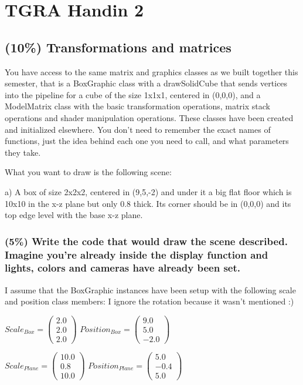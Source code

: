 \section{TGRA Handin 2}

\subsection{(10\%) Transformations and matrices}
You have access to  the same matrix and graphics classes as we built together this semester, that is a BoxGraphic class with a drawSolidCube that sends vertices into the pipeline for a cube of the size 1x1x1, centered in (0,0,0), and a ModelMatrix class with the basic transformation operations, matrix stack operations and shader manipulation operations. These classes have been created and initialized elsewhere.  You don’t need to remember the exact names of functions, just the idea behind each one you need to call, and what parameters they take. 

What you want to draw is the following scene: 

a) A box of size 2x2x2, centered in (9,5,-2) and under it a big flat floor which is 10x10 in the x-z plane but only 0.8 thick.  Its corner should be in (0,0,0) and its top edge level with the base x-z plane.

\subsubsection{(5\%) Write the code that would draw the scene described.  Imagine you’re already inside the display function and lights, colors and cameras have already been set.}

I assume that the BoxGraphic instances have been setup with the following scale and position class members: I ignore the rotation because it wasn't mentioned :)

$ Scale_{Box} = \left(\begin{array}{c}2.0\\2.0\\2.0\end{array}\right)$
$ Position_{Box} = \left(\begin{array}{c}9.0\\5.0\\-2.0\end{array}\right)$

$ Scale_{Plane} = \left(\begin{array}{c}10.0\\0.8\\10.0\end{array}\right)$
$ Position_{Plane} = \left(\begin{array}{c}5.0\\-0.4\\5.0\end{array}\right)$

